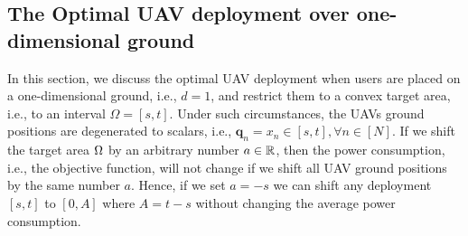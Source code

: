 \documentclass[smallabstract,smallcaptions]{dccpaper}
\renewcommand{\vp}{\mathbf q}
\newcommand{\philippstart}{\color{black}}
\newcommand{\philippend}{\color{black}}
\begin{document}
\fi %

\subsection{The Optimal UAV deployment over one-dimensional ground}

In this section, we discuss the optimal UAV deployment when users are placed on a one-dimensional ground, i.e., $d=1$,
and restrict them to a convex target area, i.e., to an interval $\Omega = [s,t]$.  Under such circumstances, the UAVs
ground positions are degenerated to scalars, i.e., $\vp_n=x_n\in[s, t], \forall n\in[N]$.  \philippstart If we shift the
target area $\Omega$ by an arbitrary number $a\in{\ensuremath{\mathbb R}}$, then the power consumption, i.e., the objective function, will not
change if we shift all UAV ground positions by the same number $a$. Hence, if we set $a=-s$ we can shift any deployment
$[s,t]$ to $[0,A]$ where $A=t-s$ without changing the average power consumption.   \philippend
\end{document}
